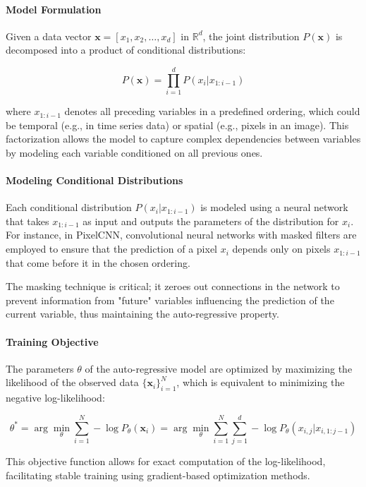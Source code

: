 \paragraph{Model Formulation}

Given a data vector \( \mathbf{x} = [x_1, x_2, \dots, x_d] \) in \( \mathbb{R}^d \), the joint distribution \( P(\mathbf{x}) \) is decomposed into a product of conditional distributions:

\[
P(\mathbf{x}) = \prod_{i=1}^{d} P(x_i | x_{1:i-1})
\]

where \( x_{1:i-1} \) denotes all preceding variables in a predefined ordering, which could be temporal (e.g., in time series data) or spatial (e.g., pixels in an image). This factorization allows the model to capture complex dependencies between variables by modeling each variable conditioned on all previous ones.

\paragraph{Modeling Conditional Distributions}

Each conditional distribution \( P(x_i | x_{1:i-1}) \) is modeled using a neural network that takes \( x_{1:i-1} \) as input and outputs the parameters of the distribution for \( x_i \). For instance, in PixelCNN, convolutional neural networks with masked filters are employed to ensure that the prediction of a pixel \( x_i \) depends only on pixels \( x_{1:i-1} \) that come before it in the chosen ordering.

The masking technique is critical; it zeroes out connections in the network to prevent information from "future" variables influencing the prediction of the current variable, thus maintaining the auto-regressive property.

\paragraph{Training Objective}

The parameters \( \theta \) of the auto-regressive model are optimized by maximizing the likelihood of the observed data \( \{ \mathbf{x}_i \}_{i=1}^N \), which is equivalent to minimizing the negative log-likelihood:

\[
\theta^* = \arg \min_{\theta} \sum_{i=1}^{N} -\log P_{\theta}(\mathbf{x}_i) = \arg \min_{\theta} \sum_{i=1}^{N} \sum_{j=1}^{d} -\log P_{\theta}(x_{i,j} | x_{i,1:j-1})
\]

This objective function allows for exact computation of the log-likelihood, facilitating stable training using gradient-based optimization methods.

